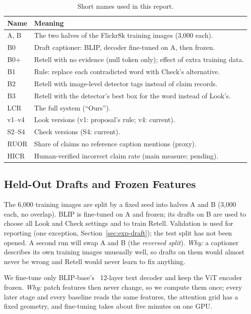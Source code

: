 \documentclass[conference]{IEEEtran}
\begin{document}
\begin{table}[t]
\caption{Short names used in this report.}
\label{tab:names}
\centering\footnotesize
\begin{tabular}{@{}>{\raggedright\arraybackslash}p{1.1cm}>{\raggedright\arraybackslash}p{6.7cm}@{}}
\toprule
Name & Meaning \\
\midrule
A, B & The two halves of the Flickr8k training images (3,000 each). \\
B0 & Draft captioner: BLIP, decoder fine-tuned on A, then frozen. \\
B0+ & Retell with no evidence (null token only); effect of extra training data. \\
B1 & Rule: replace each contradicted word with Check's alternative. \\
B2 & Retell with image-level detector tags instead of claim records. \\
B3 & Retell with the detector's best box for the word instead of Look's. \\
LCR & The full system (``Ours''). \\
v1--v4 & Look versions (v1: proposal's rule; v4: current). \\
S2--S4 & Check versions (S4: current). \\
RUOR & Share of claims no reference caption mentions (proxy). \\
HICR & Human-verified incorrect claim rate (main measure; pending). \\
\bottomrule
\end{tabular}
\end{table}

\subsection{Held-Out Drafts and Frozen Features}
The 6,000 training images are split by a fixed seed into halves A and B (3,000 each, no overlap). BLIP is
fine-tuned on A and frozen; its drafts on B are used to choose all Look and Check settings and to train Retell.
Validation is used for reporting (one exception, Section~\ref{sec:exp-draft}); the test split has not been
opened. A second run will swap A and B (the \emph{reversed split}). \emph{Why:} a captioner describes its own
training images unusually well, so drafts on them would almost never be wrong and Retell would never learn to
fix anything.

We fine-tune only BLIP-base's~\cite{li2022blip} 12-layer text decoder and keep the ViT encoder frozen.
\emph{Why:} patch features then never change, so we compute them once; every later stage and every baseline
reads the same features, the attention grid has a fixed geometry, and fine-tuning takes about five minutes on
one GPU.
\end{document}
